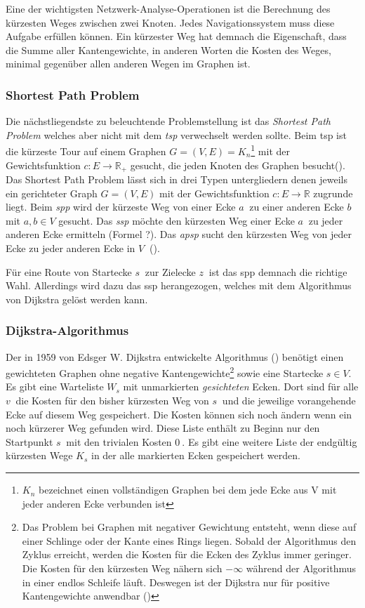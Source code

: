 Eine der wichtigsten Netzwerk-Analyse-Operationen ist die Berechnung des kürzesten Weges zwischen zwei Knoten. Jedes Navigationssystem muss diese Aufgabe erfüllen können. Ein kürzester Weg hat demnach die Eigenschaft, dass die Summe aller Kantengewichte, in anderen Worten die Kosten des Weges, minimal gegenüber allen anderen Wegen im Graphen ist.

\subsubsection{Shortest Path Problem}
Die nächstliegendste zu beleuchtende Problemstellung ist das \textit{Shortest Path Problem} welches aber nicht mit dem \textit{\gls{tsp}} verwechselt werden sollte. Beim \gls{tsp} ist die kürzeste Tour auf einem Graphen $G = (V,E) = K_{n}$\footnote{$K_{n}$ bezeichnet einen vollständigen Graphen bei dem jede Ecke aus V mit jeder anderen Ecke verbunden ist} mit der Gewichtsfunktion $c: E \rightarrow \mathbb{R}_{+}$ gesucht, die jeden Knoten des Graphen besucht(\cite[135]{algorithms}).
Das Shortest Path Problem lässt sich in drei Typen untergliedern denen jeweils ein gerichteter Graph $G = (V,E)$ mit der Gewichtsfunktion $c: E \rightarrow \mathbb{R}$ zugrunde liegt. Beim \textit{\gls{spp}} wird der kürzeste Weg von einer Ecke $a~$ zu einer anderen Ecke $b~$ mit $a,b\in V$ gesucht. Das \textit{\gls{ssp}} möchte den kürzesten Weg einer Ecke $a~$ zu jeder anderen Ecke ermitteln (Formel ?). Das \textit{\gls{apsp}} sucht den kürzesten Weg von jeder Ecke zu jeder anderen Ecke in $V~$ (\cite[169\psq]{algorithms}).

Für eine Route von Startecke $s~$ zur Zielecke $z~$ ist das \gls{spp} demnach die richtige Wahl. Allerdings wird dazu das \gls{ssp} herangezogen, welches mit dem Algorithmus von Dijkstra gelöst werden kann.


\subsubsection{Dijkstra-Algorithmus}
\label{sec:dijkstra}
Der in 1959 von Edsger W. Dijkstra entwickelte Algorithmus (\cite{dijkstra}) benötigt einen gewichteten Graphen ohne negative Kantengewichte\footnote{Das Problem bei Graphen mit negativer Gewichtung entsteht, wenn diese auf einer Schlinge oder der Kante eines Rings liegen. Sobald der Algorithmus den Zyklus erreicht, werden die Kosten für die Ecken des Zyklus immer geringer. Die Kosten für den kürzesten Weg nähern sich $-\infty $ während der Algorithmus in einer endlos Schleife läuft. Deswegen ist der Dijkstra nur für positive Kantengewichte anwendbar (\cite[194\psq]{kurt})} sowie eine Startecke $s \in V$. Es gibt eine Warteliste $W_{s}$ mit unmarkierten \textit{gesichteten} Ecken. Dort sind für alle $v~$ die Kosten für den bisher kürzesten Weg von $s~$ und die jeweilige vorangehende Ecke auf diesem Weg gespeichert. Die Kosten können sich noch ändern wenn ein noch kürzerer Weg gefunden wird. Diese Liste enthält zu Beginn nur den Startpunkt $s~$ mit den trivialen Kosten $0~$. Es gibt eine weitere Liste der endgültig kürzesten Wege $K_{s}$ in der alle markierten Ecken gespeichert werden.

